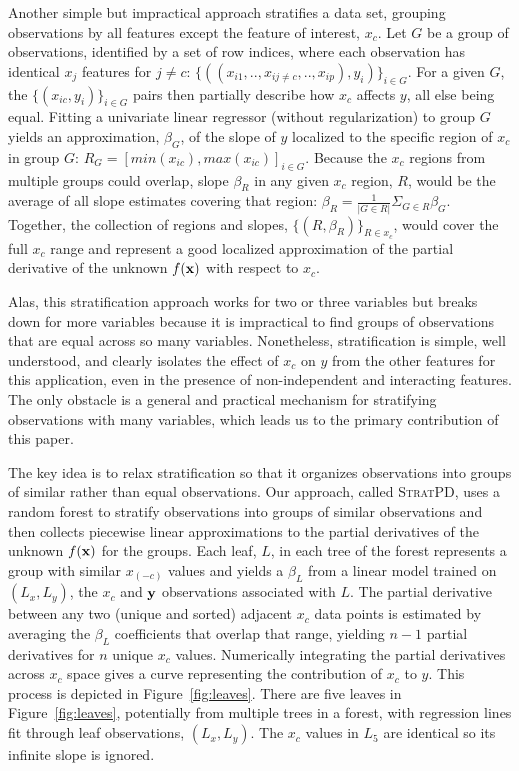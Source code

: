 \documentclass[12pt]{article}
\newcommand{\figref}[1]{Figure~\ref{#1}}
\newcommand{\spd}{\fontfamily{cmr}\textsc{\small StratPD}}
\begin{document}
Another simple but impractical approach stratifies a data set, grouping observations by all features except the feature of interest, $x_c$.  Let $G$ be a group of observations, identified by a set of row indices, where each observation has identical $x_{j}$ features for $j \neq c$: $\{((x_{i1}, .., x_{ij \neq c}, .., x_{ip}),  y_i)\}_{i \in G}$. For a given $G$, the $\{(x_{ic},  y_i)\}_{i \in G}$ pairs then partially describe how $x_c$ affects $y$, all else being equal.  Fitting a univariate linear regressor (without regularization) to group $G$ yields an approximation, $\beta_G$, of the slope of $y$ localized to the specific region of $x_c$ in group $G$: $R_G = [min(x_{ic}), max(x_{ic})]_{i \in G}$.   Because the $x_c$ regions from multiple groups could overlap, slope $\beta_R$ in any given $x_c$ region, $R$, would be the average of all slope estimates covering that region: $\beta_R = \frac{1}{|G \in R|}\Sigma_{G \in R}\beta_G$. Together, the collection of regions and slopes, $\{(R, \beta_R)\}_{R \in x_c}$, would cover the full $x_c$ range and represent a good localized approximation of the partial derivative of the unknown $f(\bf x)$ with respect to $x_c$.

Alas, this stratification approach works for two or three variables but breaks down for more variables because it is impractical to find groups of observations that are equal across so many variables.  Nonetheless, stratification is simple, well understood, and clearly isolates the effect of $x_c$ on $y$ from the other features for this application, even in the presence of non-independent and interacting features.  The only obstacle is a general and practical mechanism for stratifying observations with many variables, which leads us to the primary contribution of this paper.

The key idea is to relax stratification so that it organizes observations into groups of similar rather than equal observations.  Our approach, called \spd, uses a random forest to stratify observations into  groups of similar observations and then collects piecewise linear approximations to the partial derivatives of the unknown $f(\bf x)$ for the groups. Each leaf, $L$, in each tree of the forest represents a group with similar $x_{(-c)}$ values and yields a $\beta_L$ from a linear model trained on $(L_x, L_y)$, the $x_c$ and $\bf y$ observations associated with $L$.  The partial derivative between any two (unique and sorted) adjacent $x_c$ data points is estimated by averaging the $\beta_L$ coefficients that overlap that range, yielding $n-1$ partial derivatives for $n$ unique $x_c$ values.  Numerically integrating the partial derivatives across $x_c$ space gives a curve representing the contribution of $x_c$ to $y$. This process is depicted in \figref{fig:leaves}. There are five leaves in \figref{fig:leaves}, potentially from multiple trees in a forest, with regression lines fit through leaf observations, $(L_x, L_y)$. The $x_c$ values in $L_5$ are identical so its infinite slope is ignored.
\end{document}

